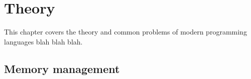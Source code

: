 \chapter{Theory}
This chapter covers the theory and common problems of modern programming languages blah blah blah.

\section{Memory management}











